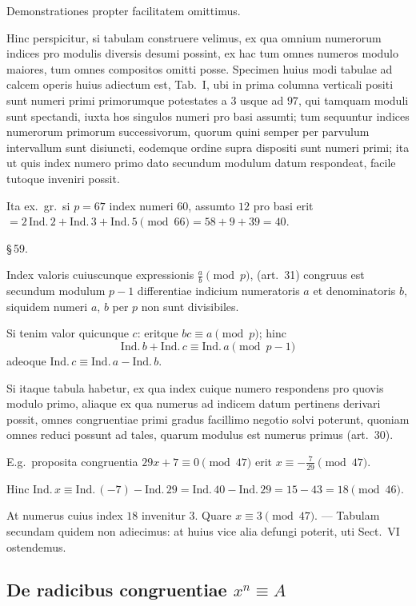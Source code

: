 \documentclass[12pt,a4paper]{article}
\theoremstyle{plain}
\theoremstyle{definition}
\theoremstyle{remark}
\begin{document}
Demonstrationes propter facilitatem omittimus.

Hinc perspicitur, si tabulam construere velimus, ex qua omnium numerorum indices pro modulis diversis desumi possint, ex hac tum omnes numeros modulo maiores, tum omnes compositos omitti posse. Specimen huius modi tabulae ad calcem operis huius adiectum est, Tab.\ I, ubi in prima columna verticali positi sunt numeri primi primorumque potestates a $3$ usque ad $97$, qui tamquam moduli sunt spectandi, iuxta hos singulos numeri pro basi assumti; tum sequuntur indices numerorum primorum successivorum, quorum quini semper per parvulum intervallum sunt disiuncti, eodemque ordine supra dispositi sunt numeri primi; ita ut quis index numero primo dato secundum modulum datum respondeat, facile tutoque inveniri possit.

Ita ex.\ gr.\ si $p = 67$ index numeri $60$, assumto $12$ pro basi erit $= 2\,\text{Ind.}\,2 + \text{Ind.}\,3 + \text{Ind.}\,5 \pmod{66} = 58 + 9 + 39 = 40$.

\begin{center}\S\,59.\end{center}

Index valoris cuiuscunque expressionis $\frac{a}{b} \pmod{p}$, (art.~31) congruus est secundum modulum $p-1$ differentiae indicium numeratoris $a$ et denominatoris $b$, siquidem numeri $a$, $b$ per $p$ non sunt divisibiles.

Si tenim valor quicunque $c$: eritque $bc \equiv a \pmod{p}$; hinc
\[
\text{Ind.}\,b + \text{Ind.}\,c \equiv \text{Ind.}\,a \pmod{p-1}
\]
adeoque $\text{Ind.}\,c \equiv \text{Ind.}\,a - \text{Ind.}\,b$.

Si itaque tabula habetur, ex qua index cuique numero respondens pro quovis modulo primo, aliaque ex qua numerus ad indicem datum pertinens derivari possit, omnes congruentiae primi gradus facillimo negotio solvi poterunt, quoniam omnes reduci possunt ad tales, quarum modulus est numerus primus (art.~30).

E.g.\ proposita congruentia $29x + 7 \equiv 0 \pmod{47}$ erit $x \equiv -\frac{7}{29} \pmod{47}$.

Hinc $\text{Ind.}\,x \equiv \text{Ind.}\,(-7) - \text{Ind.}\,29 = \text{Ind.}\,40 - \text{Ind.}\,29 = 15 - 43 = 18 \pmod{46}$.

At numerus cuius index $18$ invenitur $3$. Quare $x \equiv 3 \pmod{47}$. --- Tabulam secundam quidem non adiecimus: at huius vice alia defungi poterit, uti Sect.\ VI ostendemus.

\subsection*{De radicibus congruentiae $x^n \equiv A$}
\end{document}
